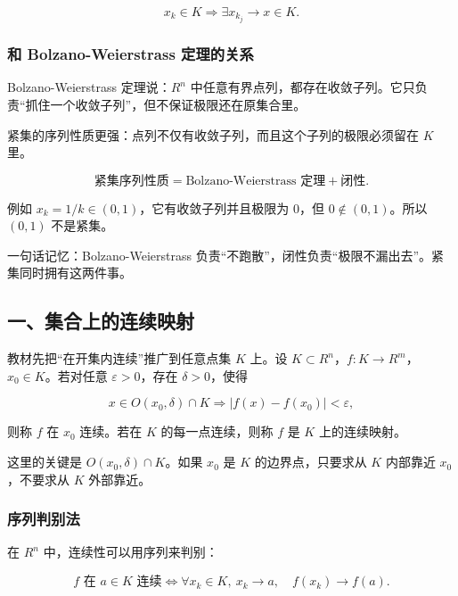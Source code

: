 \[
      x_k\in K
      \Longrightarrow
      \exists x_{k_j}\to x\in K.
    \]

\subsubsection*{和 Bolzano-Weierstrass 定理的关系}

Bolzano-Weierstrass 定理说：\(R^n\) 中任意有界点列，都存在收敛子列。它只负责“抓住一个收敛子列”，但不保证极限还在原集合里。

紧集的序列性质更强：点列不仅有收敛子列，而且这个子列的极限必须留在 \(K\) 里。

\[
      \text{紧集序列性质}
      =
      \text{Bolzano-Weierstrass 定理}
      +
      \text{闭性}.
    \]

例如 \(x_k=1/k\in(0,1)\)，它有收敛子列并且极限为 \(0\)，但 \(0\notin(0,1)\)。所以 \((0,1)\) 不是紧集。

\begin{notebox}
一句话记忆：Bolzano-Weierstrass 负责“不跑散”，闭性负责“极限不漏出去”。紧集同时拥有这两件事。
\end{notebox}

\subsection*{一、集合上的连续映射}

教材先把“在开集内连续”推广到任意点集 \(K\) 上。设 \(K\subset R^n\)，\(f:K\to R^m\)，\(x_0\in K\)。若对任意 \(\varepsilon>0\)，存在 \(\delta>0\)，使得

\[
      x\in O(x_0,\delta)\cap K
      \Longrightarrow
      |f(x)-f(x_0)|<\varepsilon,
    \]

则称 \(f\) 在 \(x_0\) 连续。若在 \(K\) 的每一点连续，则称 \(f\) 是 \(K\) 上的连续映射。

\begin{notebox}
这里的关键是 \(O(x_0,\delta)\cap K\)。如果 \(x_0\) 是 \(K\) 的边界点，只要求从 \(K\) 内部靠近 \(x_0\)，不要求从 \(K\) 外部靠近。
\end{notebox}

\subsubsection*{序列判别法}

在 \(R^n\) 中，连续性可以用序列来判别：

\[
      f\text{ 在 }a\in K\text{ 连续}
      \Longleftrightarrow
      \forall x_k\in K,\ x_k\to a,\quad f(x_k)\to f(a).
    \]

